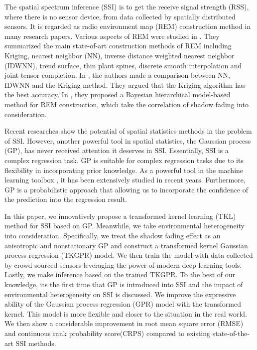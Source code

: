 \documentclass[journal, oneside, twocolumn]{IEEEtran}
\begin{document}
The spatial spectrum inference (SSI) is to get the receive signal strength (RSS), where there is no sensor device, from data collected by spatially distributed sensors. It is regarded as radio environment map (REM) construction method in many research papers\cite{Phillips2012, Pesko2014, Sato2017, Li2018, Han2019, Katagiri2020, Xu2021}. Various aspects of REM were studied in \cite{Li2018}. They summarized the main state-of-art construction methods of REM including Kriging, nearest neighbor (NN), inverse distance weighted nearest neighbor (IDWNN), trend surface, thin plant spines, discrete smooth interpolation and joint tensor completion. In \cite{Han2019}, the authors made a comparison between NN, IDWNN and the Kriging method. They argued that the Kriging algorithm has the best accuracy. In \cite{Xu2021}, they proposed a Bayesian hierarchical model-based method for REM construction, which take the correlation of shadow fading into consideration. 

Recent researches show the potential of spatial statistics methods in the problem of SSI. However, another powerful tool in spatial statistics, the Gaussian process (GP), has never received attention it deserves in SSI. Essentially, SSI is a complex regression task. GP is suitable for complex regression tasks due to its flexibility in incorporating prior knowledge. As a powerful tool in the machine learning toolbox \cite{Rasmussen2006}, it has been extensively studied in recent years\cite{Damianou2013, Wilson2013,Duvenaud2014a,Salimbeni2017a, Lee2018,Wilson2019}.  Furthermore, GP is a probabilistic approach that allowing us to incorporate the confidence of the prediction into the regression result.

In this paper, we innovatively propose a transformed kernel learning (TKL) method for SSI based on GP. Meanwhile, we take environmental heterogeneity into consideration. Specifically, we treat the shadow fading effect as an anisotropic and nonstationary GP and construct a transformed kernel Gaussian process regression (TKGPR) model. We then train the model with data collected by crowd-sourced sensors leveraging the power of modern deep learning tools. Lastly, we make inference based on the trained TKGPR. To the best of our knowledge, its the first time that GP is introduced into SSI and the impact of environmental heterogeneity on SSI is discussed. We improve the expressive ability of the Gaussian process regression (GPR) model with the transformed kernel. This model is more flexible and closer to the situation in the real world. We then show a considerable improvement in root mean square error (RMSE) and continuous rank probability score(CRPS)\cite{Gneiting2007} compared to existing state-of-the-art SSI methods.
\end{document}

